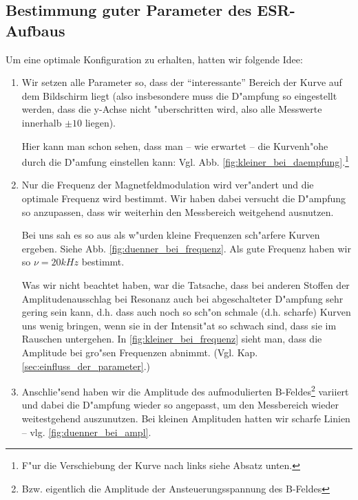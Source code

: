\documentclass[a4paper,12pt]{article}
\begin{document}
\subsection{Bestimmung guter Parameter des ESR-Aufbaus}
\label{sec:bestimmung_guter_parameter}


Um eine optimale Konfiguration zu erhalten, hatten wir folgende Idee: 
\begin{enumerate}
\item 
Wir setzen alle Parameter so, dass der "`interessante"' Bereich der Kurve auf dem
Bildschirm liegt (also insbesondere muss die D"ampfung so eingestellt werden,
dass die y-Achse nicht "uberschritten wird, also alle Messwerte innerhalb
$\pm10$ liegen).

Hier kann man schon sehen, dass man -- wie erwartet -- die Kurvenh"ohe
durch die D"amfung einstellen kann:
Vgl. Abb. \ref{fig:kleiner_bei_daempfung}.\footnote{F"ur die
  Verschiebung der Kurve nach links siehe Absatz unten.}
\item 
%
  Nur die Frequenz der Magnetfeldmodulation wird ver"andert und die
  optimale Frequenz wird bestimmt. Wir haben dabei versucht die
  D"ampfung so anzupassen, dass wir weiterhin den Messbereich
  weitgehend ausnutzen.

Bei uns sah es so aus als w"urden kleine Frequenzen
sch"arfere Kurven ergeben. Siehe Abb. \ref{fig:duenner_bei_frequenz}.
Als gute Frequenz haben wir so $\nu = 20
kHz$ bestimmt.

Was wir nicht beachtet haben, war die Tatsache, dass bei anderen
Stoffen der Amplitudenausschlag bei Resonanz auch bei abgeschalteter
D"ampfung sehr gering sein kann, d.h. dass auch noch so sch"on schmale
(d.h. scharfe) Kurven uns wenig bringen, wenn sie in der Intensit"at
so schwach sind, dass sie im Rauschen untergehen. In
\ref{fig:kleiner_bei_frequenz} sieht man, dass die Amplitude bei
gro"sen Frequenzen abnimmt. (Vgl. Kap. \ref{sec:einfluss_der_parameter}.)
\item 
Anschlie"send haben wir die Amplitude des aufmodulierten
B-Feldes\footnote{Bzw. eigentlich die Amplitude der
  Ansteuerungsspannung des B-Feldes} variiert und dabei die D"ampfung
wieder so angepasst, um den Messbereich wieder weitestgehend
auszunutzen. Bei kleinen Amplituden hatten wir scharfe Linien -- vlg. \ref{fig:duenner_bei_ampl}.


\end{enumerate}
\end{document}
